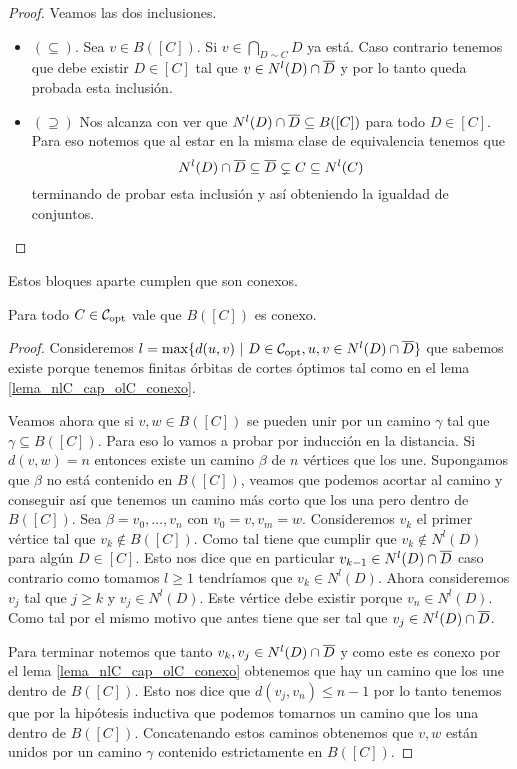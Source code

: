 \documentclass[tesis.tex]{subfiles}
\begin{document}
\begin{proof}
	Veamos las dos inclusiones.
	
	\begin{itemize}
		\item \textbf{$(\subseteq)$}. 
		Sea $v \in B([C])$. 
		Si $v \in \bigcap_{D \sim C} D$ ya está. 
		Caso contrario tenemos que debe existir $D \in [C]$ tal que $v \in N^l(D) \cap \overline D$ y por lo tanto queda probada esta inclusión.
		\item \textbf{$(\supseteq)$} 
		Nos alcanza con ver que $ N^l(D) \cap \overline D \subseteq B([C])$ para todo $D \in [C]$.
		Para eso notemos que al estar en la misma clase de equivalencia tenemos que 
		\[
			N^l(D) \cap \overline D \subseteq \overline D \subsetneq C \subseteq N^l(C)
		\]
		terminando de probar esta inclusión y así obteniendo la igualdad de conjuntos.
	\end{itemize}
\end{proof}

Estos bloques aparte cumplen que son conexos.

\begin{lema}
	Para todo $C \in {\cal C}_{\text{opt}}$ vale que $B([C])$ es conexo.
\end{lema}

\begin{proof}
	Consideremos $l = \max \{ d(u,v) \ | \ D \in {\cal C}_{\text{opt}}, u,v \in N^l(D) \cap \overline D  \}$ que sabemos existe porque tenemos finitas órbitas de cortes óptimos tal como en el lema \ref{lema_nlC_cap_olC_conexo}. 
	
	Veamos ahora que si $v,w \in B([C])$ se pueden unir por un camino $\gamma$ tal que $\gamma \subseteq B([C])$.
	Para eso lo vamos a probar por inducción en la distancia. 
	Si $d(v,w) = n$ entonces existe un camino $\beta$ de $n$ vértices que los une.
	Supongamos que $\beta$ no está contenido en $B([C])$, veamos que podemos acortar al camino y conseguir así que tenemos un camino más corto que los una pero dentro de $B([C])$.
	Sea $\beta = v_{0},\dots,v_n$ con $v_0 = v, v_m=w$.
	Consideremos $v_k$ el primer vértice tal que $v_k \notin B([C])$.
	Como tal tiene que cumplir que $v_{k} \notin N^l(D)$ para algún $D \in [C]$.
	Esto nos dice que en particular $v_{k-1} \in N^l(D) \cap \overline D$ caso contrario como tomamos $l\ge 1$ tendríamos que $v_k \in N^l(D)$.
	Ahora consideremos $v_j$ tal que $j \ge k$ y $v_j \in N^l(D)$.
	Este vértice debe existir porque $v_n \in N^l(D)$.
	Como tal por el mismo motivo que antes tiene que ser tal que $v_j \in N^l(D) \cap \overline D$.
	
	Para terminar notemos que tanto $v_k,v_j \in N^l(D) \cap \overline D$ y como este es conexo por el lema \ref{lema_nlC_cap_olC_conexo} obtenemos que hay un camino que los une dentro de $B([C])$.
	Esto nos dice que $d(v_j,v_n) \le n-1$ por lo tanto tenemos que por la hipótesis inductiva que podemos tomarnos un camino que los una dentro de $B([C])$.
	Concatenando estos caminos obtenemos que $v,w$ están unidos por un camino $\gamma$ contenido estrictamente en $B([C])$.
\end{proof}
\end{document}
